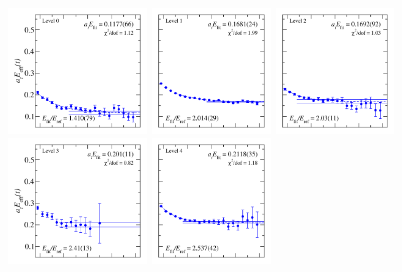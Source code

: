 \begin{figure}
  \includegraphics[width=0.329\textwidth]{figures/spectrum_a1gm/with_tq/fits/fit_0.pdf}
  \includegraphics[width=0.28\textwidth]{figures/spectrum_a1gm/with_tq/fits/fit_2.pdf}
  \includegraphics[width=0.28\textwidth]{figures/spectrum_a1gm/with_tq/fits/fit_1.pdf}\\
  \includegraphics[width=0.329\textwidth]{figures/spectrum_a1gm/with_tq/fits/fit_3.pdf}
  \includegraphics[width=0.28\textwidth]{figures/spectrum_a1gm/with_tq/fits/fit_4.pdf}

\end{figure}
